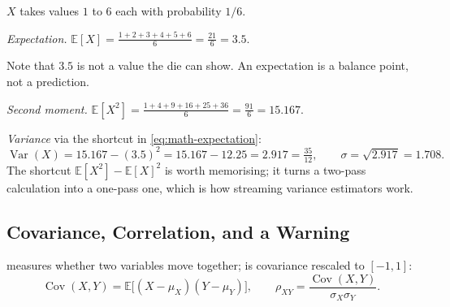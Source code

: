\begin{workedexample}
$X$ takes values $1$ to $6$ each with probability $1/6$.

\emph{Expectation.}
$\mathbb{E}[X] = \frac{1+2+3+4+5+6}{6} = \frac{21}{6} = 3.5$.

Note that $3.5$ is not a value the die can show. An expectation is a balance
point, not a prediction.

\emph{Second moment.}
$\mathbb{E}[X^2] = \frac{1+4+9+16+25+36}{6} = \frac{91}{6} = 15.167$.

\emph{Variance} via the shortcut in \cref{eq:math-expectation}:
\[
  \operatorname{Var}(X) = 15.167 - (3.5)^2 = 15.167 - 12.25 = 2.917
  = \tfrac{35}{12},
  \qquad \sigma = \sqrt{2.917} = 1.708 .
\]
The shortcut $\mathbb{E}[X^2]-\mathbb{E}[X]^2$ is worth memorising; it turns a
two-pass calculation into a one-pass one, which is how streaming variance
estimators work.
\end{workedexample}

\subsection{Covariance, Correlation, and a Warning}

 measures whether two variables move together;
 is covariance rescaled to $[-1,1]$:
\begin{equation}
  \operatorname{Cov}(X,Y) = \mathbb{E}\bigl[(X-\mu_X)(Y-\mu_Y)\bigr],
  \qquad
  \rho_{XY} = \frac{\operatorname{Cov}(X,Y)}{\sigma_X\sigma_Y}.
  \label{eq:math-covariance}
\end{equation}

